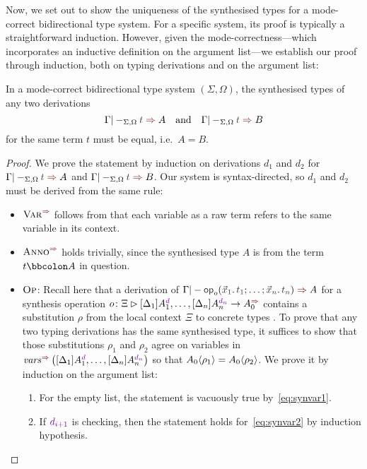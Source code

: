 Now, we set out to show the uniqueness of the synthesised types for a mode-correct bidirectional type system.
For a specific system, its proof is typically a straightforward induction.
However, given the mode-correctness---which incorporates an inductive definition on the argument list---we establish our proof through induction, both on typing derivations and on the argument list:
\begin{lemma}\label{thm:unique-syn}
  In a mode-correct bidirectional type system $(\Sigma, \Omega)$, the synthesised types of any two derivations
  \[
    \Gamma |-_{\Sigma, \Omega} \isTerm{t} \syn A
    \quad\text{and}\quad
    \Gamma |-_{\Sigma, \Omega} \isTerm{t} \syn B
  \]
  for the same term $t$ must be equal, i.e.\ $A = B$.
\end{lemma}
\begin{proof}%
  We prove the statement by induction on derivations $d_1$ and $d_2$ for $\Gamma |-_{\Sigma, \Omega} \isTerm{t} \syn A$ and $\Gamma |-_{\Sigma, \Omega} \isTerm{t} \syn B$.
  Our system is syntax-directed, so $d_1$ and $d_2$ must be derived from the same rule: 
  \begin{itemize}
    \item $\SynRule{Var}$ follows from that each variable as a raw term refers to the same variable in its context.
    \item $\SynRule{Anno}$ holds trivially, since the synthesised type $A$ is from the term $t \annotate A$ in question.
    \item $\textnormal{\textsc{Op}}$: Recall here that a derivation of\/ $\Gamma |- \tmOpts \syn A$ for a synthesis operation $o\colon \Xi \rhd [\Delta_{1}] A_{1}^{\dir{d}}, \ldots, [\Delta_n]A_{n}^{\dir{d_n}} \to A_0^{\syn}$ contains a substitution $\rho$ from the local context $\Xi$ to concrete types .
      To prove that any two typing derivations has the same synthesised type, it suffices to show that those substitutions $\rho_1$ and $\rho_2$ agree on variables in $\synvar\left([\Delta_{1}] A_{1}^{\dir{d}}, \ldots, [\Delta_n]A_{n}^{\dir{d_n}}\right)$ so that ${A_0}\!\left<{\rho_1}\right> = {A_0}\!\left<{\rho_2}\right>$.
      We prove it by induction on the argument list:
      \begin{enumerate}
        \item For the empty list, the statement is vacuously true by~\eqref{eq:synvar1}.
        \item If $\dir{d_{i+1}}$ is checking, then the statement holds for~\eqref{eq:synvar2} by induction hypothesis.

\end{enumerate}
\end{itemize}
\end{proof}

